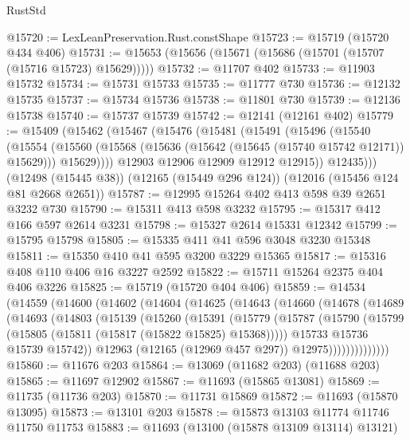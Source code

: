 \begin{lexlean}{RustStd}
\begin{coremodule}
@15720 := LexLeanPreservation.Rust.constShape
@15723 := @15719 (@15720 @434 @406)
@15731 := @15653 (@15656 (@15671 (@15686 (@15701 (@15707 (@15716 @15723) @15629)))))
@15732 := @11707 @402
@15733 := @11903 @15732
@15734 := @15731 @15733
@15735 := @11777 @730
@15736 := @12132 @15735
@15737 := @15734 @15736
@15738 := @11801 @730
@15739 := @12136 @15738
@15740 := @15737 @15739
@15742 := @12141 (@12161 @402)
@15779 := @15409
    (@15462
      (@15467
        (@15476
          (@15481
            (@15491
              (@15496
                (@15540
                  (@15554
                    (@15560
                      (@15568 (@15636 (@15642 (@15645 (@15740 @15742 @12171)) @15629)))
                      @15629))))
              @12903
              @12906
              @12909
              @12912
              @12915))
          @12435)))
    (@12498 (@15445 @38))
    (@12165 (@15449 @296 @124))
    (@12016 (@15456 @124 @81 @2668 @2651))
@15787 := @12995 @15264 @402 @413 @598 @39 @2651 @3232 @730
@15790 := @15311 @413 @598 @3232
@15795 := @15317 @412 @166 @597 @2614 @3231
@15798 := @15327 @2614 @15331 @12342
@15799 := @15795 @15798
@15805 := @15335 @411 @41 @596 @3048 @3230 @15348
@15811 := @15350 @410 @41 @595 @3200 @3229 @15365
@15817 := @15316 @408 @110 @406 @16 @3227 @2592
@15822 := @15711 @15264 @2375 @404 @406 @3226
@15825 := @15719 (@15720 @404 @406)
@15859 := @14534
    (@14559
      (@14600
        (@14602
          (@14604
            (@14625
              (@14643
                (@14660
                  (@14678
                    (@14689
                      (@14693
                        (@14803
                          (@15139
                            (@15260
                              (@15391
                                (@15779
                                  (@15787
                                    (@15790
                                      (@15799 (@15805 (@15811 (@15817 (@15822 @15825) @15368)))))
                                    @15733
                                    @15736
                                    @15739
                                    @15742))
                                @12963
                                (@12165 (@12969 @457 @297))
                                @12975))))))))))))))
@15860 := @11676 @203
@15864 := @13069 (@11682 @203) (@11688 @203)
@15865 := @11697 @12902
@15867 := @11693 (@15865 @13081)
@15869 := @11735 (@11736 @203)
@15870 := @11731 @15869
@15872 := @11693 (@15870 @13095)
@15873 := @13101 @203
@15878 := @15873 @13103 @11774 @11746 @11750 @11753
@15883 := @11693 (@13100 (@15878 @13109 @13114) @13121)

\end{coremodule}
\end{lexlean}
